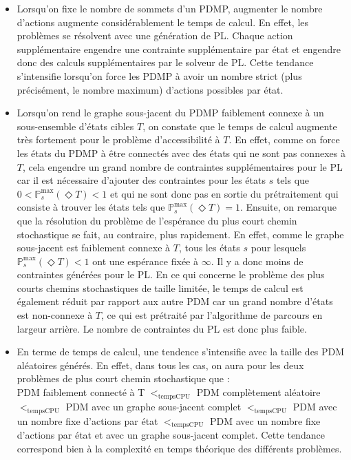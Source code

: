 \documentclass[12pt,a4paper]{report}
\theoremstyle{definition}%
\theoremstyle{remark}
\newcommand{\pr}{\mathbb{P}}
\let\labelitemi\labelitemii
\begin{document}
\begin{itemize}
	\renewcommand{\labelitemi}{\tiny$\bullet$}
	\item Lorsqu'on fixe le nombre de sommets d'un PDMP, augmenter le nombre d'actions augmente considérablement le
	temps de calcul. En effet, les problèmes se résolvent avec une génération de
	PL. Chaque action supplémentaire engendre une
	contrainte supplémentaire par état et engendre donc des calculs supplémentaires par
	le solveur de PL. Cette tendance s'intensifie
	lorsqu'on force les PDMP à avoir un nombre strict (plus précisément, le nombre maximum) d'actions possibles par
	état.
	\item Lorsqu'on rend le graphe sous-jacent du PDMP faiblement connexe à un sous-ensemble d'états cibles $T$, on constate que le
	temps de calcul augmente très fortement pour le problème d'accessibilité à
	$T$. En effet, comme on force les états du PDMP à être connectés avec des états qui ne sont pas connexes à $T$, cela engendre un grand nombre de contraintes supplémentaires
	pour le PL car il est nécessaire d'ajouter des contraintes pour les états $s$ tels que $0 < \pr^{\max}_s (\Diamond T)< 1$ et
	qui ne sont donc pas en sortie du prétraitement qui consiste à trouver les états tels que
	$\pr^{\max}_s (\Diamond T) = 1$.
	Ensuite, on remarque que la résolution du problème de
	l'espérance du plus court chemin stochastique se fait, au contraire, plus
	rapidement. En effet, comme le graphe sous-jacent est faiblement connexe à
	$T$, tous les états $s$ pour lesquels $\pr^{\max}_s(\Diamond T) < 1$ ont une
	espérance fixée à $\infty$. Il y a donc moins de contraintes générées pour le
	PL. En ce qui concerne le problème des plus courts chemins stochastiques de
	taille limitée, le temps de calcul est également réduit par rapport aux autre
	PDM car un grand nombre d'états est non-connexe à $T$, ce qui est
	prétraité par l'algorithme de parcours en largeur arrière. Le nombre de
	contraintes du PL est donc plus faible.
	\item En terme de temps de calcul, une tendence s'intensifie avec la taille
		des PDM aléatoires générés. En effet, dans tous les cas, on aura pour les deux problèmes de plus court chemin stochastique que : \\
			PDM faiblement connecté à T $<_{\text{tempsCPU}}$
			PDM complètement aléatoire $<_{\text{tempsCPU}}$
			PDM avec un graphe sous-jacent complet $<_{\text{tempsCPU}}$
			PDM avec un nombre fixe d'actions par état $<_{\text{tempsCPU}}$
			PDM avec un nombre fixe d'actions par état et avec un graphe sous-jacent complet.
		Cette tendance correspond bien à la complexité en temps théorique des
		différents problèmes.
\end{itemize}
\end{document}
